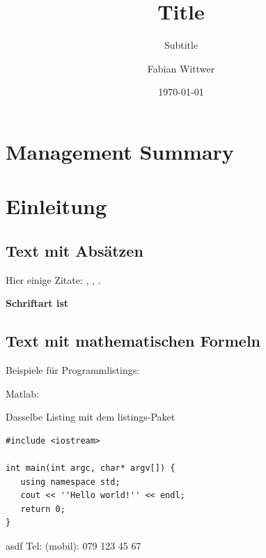 \documentclass[
  10pt, %
  a4paper, %
  twoside, %
  openright, %
  numbers=noenddot, %
  BCOR=5mm, %
  parskip=half*, %
  thesis, %
]{bfhbook}
\author{Fabian Wittwer}
\title{Title}
\subtitle{Subtitle}
\date{\today} %
\newcommand{\Tel}[2]{Tel: (#1): #2}
\begin{document}
\maketitle

\frontmatter %
\allowdisplaybreaks

\tableofcontents

\sloppy
\mainmatter %
\chapter*{Management Summary}
\chapter{Einleitung}
\section{Text mit Absätzen}
Hier einige Zitate: \cite{Einstein1923}, \cite{NS87a}, \cite{SH96}.

{\Large \textbf{Schriftart ist \testfont}}

\Blindtext
\section{Text mit mathematischen Formeln}
\blindmathpaper

Beispiele für Programmlistings:

Matlab:


Dasselbe Listing mit dem listings-Paket
\lstset{language=C}
\begin{lstlisting}
#include <iostream>

int main(int argc, char* argv[]) {
   using namespace std;
   cout << ''Hello world!'' << endl;
   return 0;
}
\end{lstlisting}

\blindtext asdf
\Tel{mobil}{079 123 45 67}
\end{document}
